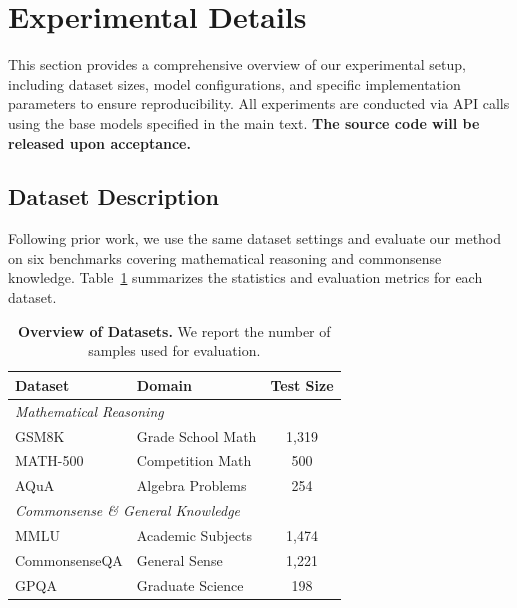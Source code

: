 \documentclass[11pt]{article}
\begin{document}
\section{Experimental Details}
This section provides a comprehensive overview of our experimental setup, including dataset sizes, model configurations, and specific implementation parameters to ensure reproducibility. All experiments are conducted via API calls using the base models specified in the main text. \textbf{The source code will be released upon acceptance.}%

\subsection{Dataset Description}
\label{sec:appendix_datasets}

Following prior work, we use the same dataset settings and evaluate our method on six benchmarks covering mathematical reasoning and commonsense knowledge. Table~\ref{tab:dataset_stats} summarizes the statistics and evaluation metrics for each dataset.

\begin{table}[h]
    \centering
    \small %
    \setlength{\tabcolsep}{4pt}
    \begin{tabular}{llc}
    \toprule
    \textbf{Dataset} & \textbf{Domain} & \textbf{Test Size} \\
    \midrule
    \multicolumn{3}{l}{\textit{Mathematical Reasoning}} \\
    GSM8K & Grade School Math & 1,319  \\
    MATH-500 & Competition Math & 500 \\
    AQuA & Algebra Problems & 254  \\
    \midrule
    \multicolumn{3}{l}{\textit{Commonsense \& General Knowledge}} \\
    MMLU & Academic Subjects & 1,474  \\
    CommonsenseQA & General Sense & 1,221  \\
    GPQA & Graduate Science & 198  \\
    \bottomrule
    \end{tabular}
    \caption{\textbf{Overview of Datasets.} We report the number of samples used for evaluation.}
    \label{tab:dataset_stats}
\end{table}
\end{document}
